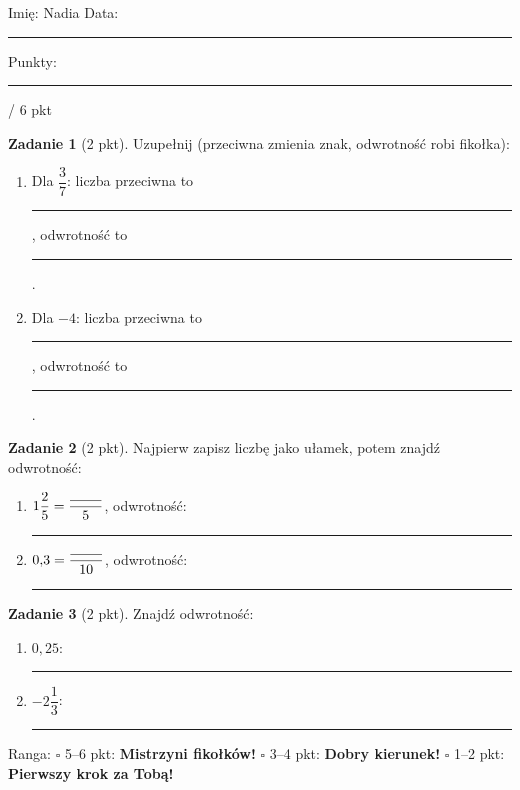 \documentclass[11pt,a4paper]{article}
\begin{document}

\vspace{0.2em}
Imię: Nadia \hfill Data: \rule{3cm}{0.4pt} \hfill Punkty: \rule{1.2cm}{0.4pt} / 6 pkt

\vspace{0.6em}
\textbf{Zadanie 1} (2 pkt). Uzupełnij (przeciwna zmienia znak, odwrotność robi fikołka):
\begin{enumerate}[label=\alph*), leftmargin=*, itemsep=6pt]
  \item Dla $\dfrac{3}{7}$: liczba przeciwna to \rule{3cm}{0.4pt}, odwrotność to \rule{3cm}{0.4pt}.
  \item Dla $-4$: liczba przeciwna to \rule{3cm}{0.4pt}, odwrotność to \rule{3cm}{0.4pt}.
\end{enumerate}

\textbf{Zadanie 2} (2 pkt). Najpierw zapisz liczbę jako ułamek, potem znajdź odwrotność:
\begin{enumerate}[label=\alph*), leftmargin=*, itemsep=6pt]
  \item $1\dfrac{2}{5}=\dfrac{\rule{0.8cm}{0.4pt}}{5}$, odwrotność: \rule{3cm}{0.4pt}
  \item $0{,}3=\dfrac{\rule{0.8cm}{0.4pt}}{10}$, odwrotność: \rule{3cm}{0.4pt}
\end{enumerate}

\textbf{Zadanie 3} (2 pkt). Znajdź odwrotność:
\begin{enumerate}[label=\alph*), leftmargin=*, itemsep=6pt]
  \item $0{,}25$: \rule{3cm}{0.4pt}
  \item $-2\dfrac{1}{3}$: \rule{3cm}{0.4pt}
\end{enumerate}

\vspace{0.6em}
\begin{tcolorbox}[colback=white, colframe=cel, boxrule=0.6pt, arc=2pt]
Ranga: \quad $\square$ 5--6 pkt: \textbf{Mistrzyni fikołków!} \quad $\square$ 3--4 pkt: \textbf{Dobry kierunek!} \quad $\square$ 1--2 pkt: \textbf{Pierwszy krok za Tobą!}
\end{tcolorbox}
\end{document}
